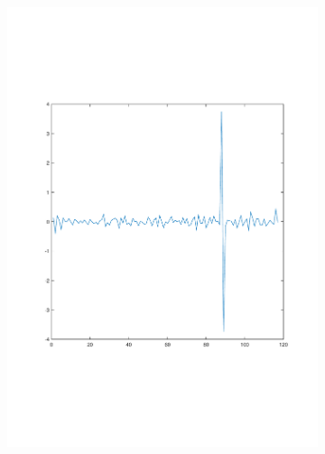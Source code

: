 \documentclass[sigconf]{acmart}
\begin{document}
\begin{figure}[!htp]
	\centering
	\begin{subfigure}[t]{0.4\linewidth}
		\centering
		\includegraphics[width=0.95\linewidth, trim={100 100 0 0}, clip=true]{fig/RTT_8}
		\label{fig:3.3a}
	\end{subfigure}
	\begin{subfigure}[t]{0.4\linewidth}
		\centering

\end{subfigure}
\end{figure}
\end{document}
